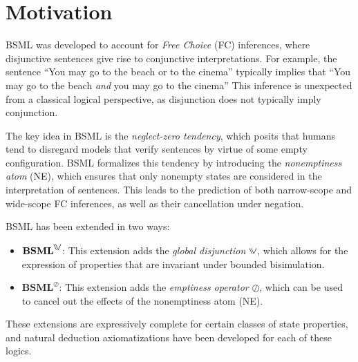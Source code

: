 \section{Motivation}\label{Motivation}

BSML was developed to account for \textit{Free Choice} (FC) inferences, 
where disjunctive sentences give rise to conjunctive interpretations. 
For example, the sentence ``You may go to the beach or to the cinema'' typically implies 
that ``You may go to the beach \textit{and} you may go to the cinema'' 
This inference is unexpected from a classical logical perspective, 
as disjunction does not typically imply conjunction.

The key idea in BSML is the \textit{neglect-zero tendency}, 
which posits that humans tend to disregard models that verify sentences by virtue of some empty configuration. 
BSML formalizes this tendency by introducing the \textit{nonemptiness atom} (NE), which ensures that only nonempty states are considered in the interpretation of sentences. 
This leads to the prediction of both narrow-scope and wide-scope FC inferences, as well as their cancellation under negation.

BSML has been extended in two ways:
\begin{itemize}
    \item \(\textbf{BSML}^{\inqdisj}\): This extension adds the \textit{global disjunction} \(\inqdisj\), which allows for the expression of properties that are invariant under bounded bisimulation.
    \item \(\textbf{BSML}^{\oslash}\): This extension adds the \textit{emptiness operator} \(\oslash\), which can be used to cancel out the effects of the nonemptiness atom (NE).
\end{itemize}

These extensions are expressively complete for certain classes of state properties, and natural deduction axiomatizations have been developed for each of these logics.

